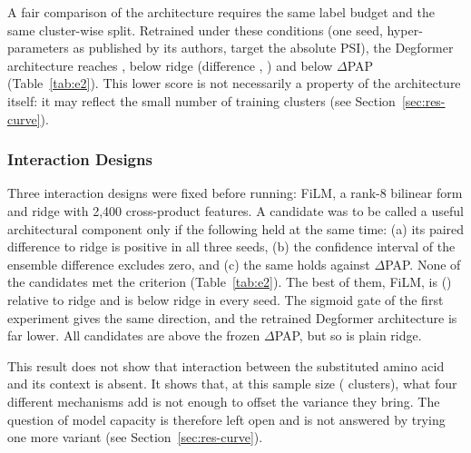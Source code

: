 A fair comparison of the architecture requires the same label budget and the same cluster-wise split. Retrained
under these conditions (one seed, hyper-parameters as published by its authors, target the absolute PSI),
the Degformer architecture reaches \nAucDegArch{}, below ridge (difference \nDDegArchRidge{}, \nCIDegArchRidge{}) and below
$\Delta$PAP (Table~\ref{tab:e2}). This lower score is not necessarily a property of the architecture
itself: it may reflect the small number of training clusters (see Section~\ref{sec:res-curve}).

\subsubsection{Interaction Designs}\label{sec:res-interaction}
Three interaction designs were fixed before running: FiLM, a rank-8 bilinear form and ridge with 2,400
cross-product features. A candidate was to be called a useful architectural component only if the following
held at the same time: (a) its paired difference to ridge is positive in all three seeds, (b) the confidence
interval of the ensemble difference excludes zero, and (c) the same holds against $\Delta$PAP. None of the
candidates met the criterion (Table~\ref{tab:e2}). The best of them, FiLM, is \nDFilmRidge{} (\nCIFilmRidge{})
relative to ridge and is below ridge in every seed. The sigmoid gate of the first experiment gives the same
direction, and the retrained Degformer architecture is far lower. All candidates are above the frozen
$\Delta$PAP, but so is plain ridge.

\begin{table}[htbp]
  \centering
  \caption{Interaction designs against ridge M3. ``Criterion met'' applies the pre-registered rule above; for the
  sigmoid gate and the one-seed Degformer architecture the rule is applied descriptively.}\label{tab:e2}
  
\end{table}

This result does not show that interaction between the substituted amino acid and its context is absent. It
shows that, at this sample size (\nNClu{} clusters), what four different mechanisms add is not enough to
offset the variance they bring. The question of model capacity is therefore left open and is not answered by
trying one more variant (see Section~\ref{sec:res-curve}).

